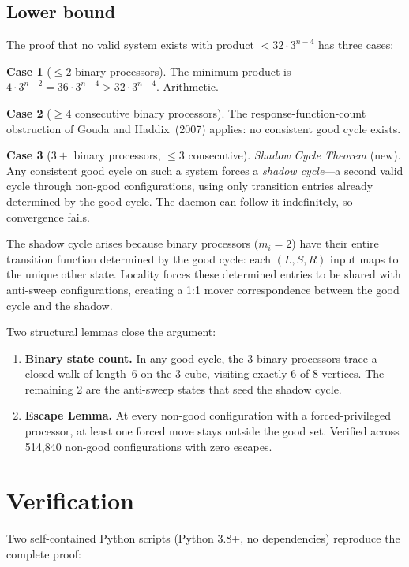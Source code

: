 \documentclass[11pt]{article}
\begin{document}
\subsection*{Lower bound}

The proof that no valid system exists with product $< 32 \cdot 3^{n-4}$ has three cases:

\medskip\noindent\textbf{Case 1} ($\le 2$ binary processors). The minimum product is $4 \cdot 3^{n-2} = 36 \cdot 3^{n-4} > 32 \cdot 3^{n-4}$. Arithmetic.

\medskip\noindent\textbf{Case 2} ($\ge 4$ consecutive binary processors). The response-function-count obstruction of Gouda and Haddix~(2007) applies: no consistent good cycle exists.

\medskip\noindent\textbf{Case 3} ($3+$ binary processors, $\le 3$ consecutive). \emph{Shadow Cycle Theorem} (new). Any consistent good cycle on such a system forces a \emph{shadow cycle}---a second valid cycle through non-good configurations, using only transition entries already determined by the good cycle. The daemon can follow it indefinitely, so convergence fails.

The shadow cycle arises because binary processors ($m_i = 2$) have their entire transition function determined by the good cycle: each $(L,S,R)$ input maps to the unique other state. Locality forces these determined entries to be shared with anti-sweep configurations, creating a 1:1 mover correspondence between the good cycle and the shadow.

Two structural lemmas close the argument:
\begin{enumerate}
\item \textbf{Binary state count.} In any good cycle, the 3 binary processors trace a closed walk of length~6 on the 3-cube, visiting exactly 6 of 8 vertices. The remaining 2 are the anti-sweep states that seed the shadow cycle.

\item \textbf{Escape Lemma.} At every non-good configuration with a forced-privileged processor, at least one forced move stays outside the good set. Verified across 514{,}840 non-good configurations with zero escapes.
\end{enumerate}

\section{Verification}

Two self-contained Python scripts (Python 3.8+, no dependencies) reproduce the complete proof:
\end{document}
